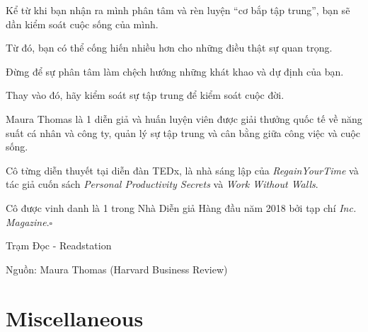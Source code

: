 \documentclass{article}
\begin{document}
Kể từ khi bạn nhận ra mình phân tâm và rèn luyện ``cơ bắp tập trung'', bạn sẽ dần kiểm soát cuộc sống của mình.

Từ đó, bạn có thể cống hiến nhiều hơn cho những điều thật sự quan trọng.

Đừng để sự phân tâm làm chệch hướng những khát khao và dự định của bạn.

Thay vào đó, hãy kiểm soát sự tập trung để kiểm soát cuộc đời.

%
Maura Thomas là 1 diễn giả và huấn luyện viên được giải thưởng quốc tế về năng suất cá nhân và công ty, quản lý sự tập trung và cân bằng giữa công việc và cuộc sống.

Cô từng diễn thuyết tại diễn đàn TEDx, là nhà sáng lập của \textit{RegainYourTime} và tác giả cuốn sách \textit{Personal Productivity Secrets} và \textit{Work Without Walls}.

Cô được vinh danh là 1 trong Nhà Diễn giả Hàng đầu năm 2018 bởi tạp chí \textit{Inc. Magazine}.\hfill$\square$
\begin{flushright}
	Trạm Đọc - Readstation
	
	Nguồn: Maura Thomas (Harvard Business Review)
\end{flushright}






\section{Miscellaneous}


\printbibliography[heading=bibintoc]
	
\end{document}
